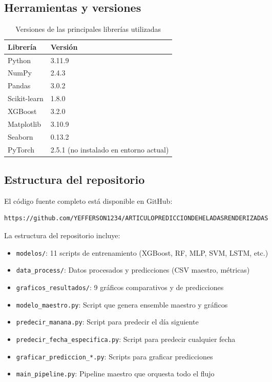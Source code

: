 \documentclass[11pt, a4paper]{article}
\begin{document}
\subsection{Herramientas y versiones}

\begin{table}[h]
\centering
\caption{Versiones de las principales librerías utilizadas}
\begin{tabular}{ll}
\toprule
\textbf{Librería} & \textbf{Versión} \\
\midrule
Python & 3.11.9 \\
NumPy & 2.4.3 \\
Pandas & 3.0.2 \\
Scikit-learn & 1.8.0 \\
XGBoost & 3.2.0 \\
Matplotlib & 3.10.9 \\
Seaborn & 0.13.2 \\
PyTorch & 2.5.1 (no instalado en entorno actual) \\
\bottomrule
\end{tabular}
\end{table}

\subsection{Estructura del repositorio}

El código fuente completo está disponible en GitHub:

\begin{verbatim}
https://github.com/YEFFERSON1234/ARTICULOPREDICCIONDEHELADASRENDERIZADAS
\end{verbatim}

La estructura del repositorio incluye:
\begin{itemize}
    \item \texttt{modelos/}: 11 scripts de entrenamiento (XGBoost, RF, MLP, SVM, LSTM, etc.)
    \item \texttt{data\_process/}: Datos procesados y predicciones (CSV maestro, métricas)
    \item \texttt{graficos\_resultados/}: 9 gráficos comparativos y de predicciones
    \item \texttt{modelo\_maestro.py}: Script que genera ensemble maestro y gráficos
    \item \texttt{predecir\_manana.py}: Script para predecir el día siguiente
    \item \texttt{predecir\_fecha\_especifica.py}: Script para predecir cualquier fecha
    \item \texttt{graficar\_prediccion\_*.py}: Scripts para graficar predicciones
    \item \texttt{main\_pipeline.py}: Pipeline maestro que orquesta todo el flujo
\end{itemize}
\end{document}
